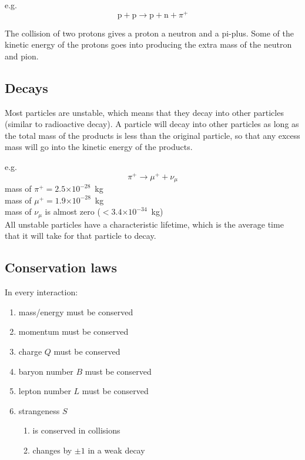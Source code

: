 \documentclass[a4paper,12pt]{article}
\providecommand{\e}[1]{\ensuremath{\times 10^{#1}}}
\begin{document}
e.g.\[\mathrm{p}+\mathrm{p}\longrightarrow\mathrm{p}+\mathrm{n}+\pi^{+}\]

The collision of two protons gives a proton a neutron and a pi-plus.  Some of the kinetic energy of the protons goes into producing the extra mass of the neutron and pion.

\subsection{Decays}

Most particles are unstable, which means that they decay into other particles (similar to radioactive decay).  A particle will decay into other particles as long as the total mass of the products is less than the original particle, so that any excess mass will go into the kinetic energy of the products.

e.g.\ \[\pi^{+}\longrightarrow\mu^{+}+\nu_{\mu}\]
mass of $\pi^{+} = 2.5\e{-28}$~kg\\
mass of $\mu^{+} = 1.9\e{-28}$~kg\\
mass of $\nu_{\mu}$ is almost zero ($<3.4\e{-34}$~kg)\\


All unstable particles have a characteristic lifetime, which is the average time that it will take for that particle to decay.  

\subsection{Conservation laws}

In every interaction:
\begin{enumerate}
\item mass/energy must be conserved
\item momentum must be conserved
\item charge $Q$ must be conserved
\item baryon  number $B$ must be conserved
\item lepton number $L$ must be conserved
\item strangeness $S$ \begin{enumerate}\item is conserved in collisions
\item changes by $\pm 1$ in a weak decay\end{enumerate}
\end{enumerate}
\end{document}
